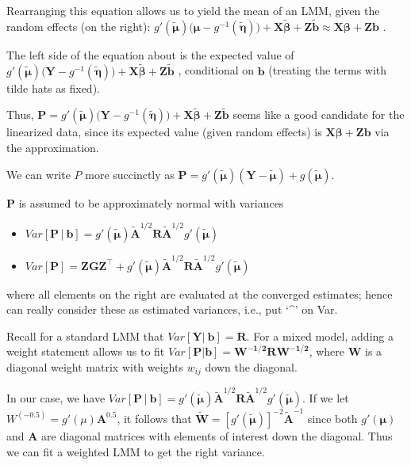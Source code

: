 \documentclass[
  9pt,
  ignorenonframetext,
]{beamer}
\begin{document}
\begin{frame}{}
\protect\hypertarget{section-2}{}
Rearranging this equation allows us to yield the mean of an LMM, given
the random effects (on the right):
\(g' (\pmb {\tilde \mu })\big(\pmb \mu - g^{-1} (\pmb {\tilde \eta}) \big)+\pmb {X \tilde \beta} + \pmb {Z \tilde b} \approx \pmb {X\beta} + \pmb {Zb}\)
.

The left side of the equation about is the expected value of
\(g' (\pmb {\tilde \mu}) \big(\pmb Y - g^{-1} (\pmb {\tilde \eta})\big) + \pmb {X \tilde \beta} + \pmb {Z \tilde b}\)
, conditional on \(\pmb b\) (treating the terms with tilde hats as
fixed).

Thus,
\(\pmb P = g' (\pmb {\tilde \mu})\big(\pmb Y - g^{-1} (\pmb {\tilde \eta})\big) + \pmb {X {\tilde \beta}} + \pmb {Z {\tilde b}}\)
seems like a good candidate for the linearized data, since its expected
value (given random effects) is \(\pmb {X\beta} + \pmb {Zb}\) via the
approximation.

We can write \(P\) more succinctly as
\(\pmb P=g' (\pmb {\tilde \mu})(\pmb Y- \pmb {\tilde \mu}) + g(\pmb {\tilde \mu})\).
\end{frame}

\begin{frame}{}
\protect\hypertarget{section-3}{}
\(\pmb P\) is assumed to be approximately normal with variances

\begin{itemize}
\item
  \(Var[\pmb P│ \pmb b] = g' (\pmb {\tilde \mu}) \pmb {\tilde A}^{1/2} \pmb R\pmb {\tilde A}^{1/2} g'(\pmb {\tilde \mu})\)
\item
  \(Var[\pmb P]= \pmb {ZGZ}^{\top}+g'(\pmb {\tilde \mu}) \pmb {\tilde A}^{1/2} \pmb R\pmb {\tilde A}^{1/2} g'(\pmb {\tilde \mu})\)
\end{itemize}

where all elements on the right are evaluated at the converged
estimates; hence can really consider these as estimated variances, i.e.,
put `\^{}' on Var.

Recall for a standard LMM that \(Var[\pmb Y|\ \pmb b]=\pmb R\). For a
mixed model, adding a weight statement allows us to fit
\(Var[\pmb P| \pmb b]= \pmb {W^{-1/2} RW^{-1/2}}\), where \(\pmb W\) is
a diagonal weight matrix with weights \(w_{ij}\) down the diagonal.

In our case, we have
\(Var[\pmb P│\pmb b]=g'(\pmb {\tilde \mu}) \pmb {\tilde A}^{1/2} \pmb R \pmb {\tilde A}^{1/2} g'(\pmb {\tilde \mu})\).
If we let \(W^(-0.5)=g' (\mu) \pmb A^{0.5}\), it follows that
\(\pmb {\tilde W} =[g'(\pmb {\tilde \mu}) ]^{-2} \pmb {\tilde A} ^{-1}\)
since both \(g'(\pmb \mu)\) and \(\pmb A\) are diagonal matrices with
elements of interest down the diagonal. Thus we can fit a weighted LMM
to get the right variance.
\end{frame}
\end{document}
